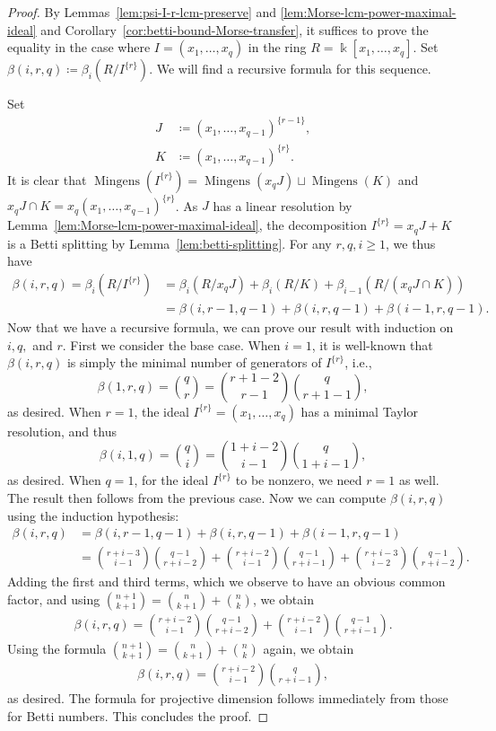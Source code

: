 \documentclass[reqno]{amsart}
\DeclareMathOperator{\mingens}{Mingens}
\theoremstyle{definition}
\theoremstyle{remark}
\numberwithin{equation}{section}
\begin{document}
\begin{proof}
    By Lemmas~\ref{lem:psi-I-r-lcm-preserve} and \ref{lem:Morse-lcm-power-maximal-ideal} and Corollary~\ref{cor:betti-bound-Morse-transfer}, it suffices to prove the equality in the case where $I=(x_1,\dots, x_q)$ in the ring $R=\Bbbk[x_1,\dots, x_q]$. Set $\beta(i,r,q)\coloneqq \beta_i(R/I^{\{r\}})$. We will find a recursive formula for this sequence.
    
    Set
    \begin{align*}
        J&\coloneqq (x_1,\dots, x_{q-1})^{\{r-1\}},\\
        K&\coloneqq (x_1,\dots, x_{q-1})^{\{r\}}.
    \end{align*}
    It is clear that $\mingens(I^{\{r\}})=\mingens(x_qJ)\sqcup \mingens(K)$ and $x_qJ\cap K= x_q (x_1,\dots, x_{q-1})^{\{r\}}$.   
    As $J$ has a linear resolution by Lemma~\ref{lem:Morse-lcm-power-maximal-ideal}, the decomposition $I^{\{r\}}=x_qJ+K$ is a Betti splitting by Lemma~\ref{lem:betti-splitting}. For any $r,q,i\geq 1$, we thus have
    \begin{align*}
        \beta(i,r,q) = \beta_i(R/I^{\{r\}}) &= \beta_i(R/x_qJ) + \beta_i(R/K) + \beta_{i-1}(R/(x_qJ\cap K))\\
        &=  \beta(i,r-1,q-1) + \beta(i,r,q-1)  + \beta(i-1,r,q-1).
    \end{align*}
    Now that we have a recursive formula, we can prove our result with induction on $i,q,$ and $r$. First we consider the base case. When $i=1$, it is well-known that $\beta(i,r,q)$ is simply the minimal number of generators of $I^{\{r\}}$, i.e.,
    \[
    \beta(1,r,q) = \binom{q}{r} = \binom{r+1-2}{r-1}\binom{q}{r+1-1},
    \]
    as desired. When $r=1$, the ideal $I^{\{r\}}=(x_1,\dots,x_q)$ has a minimal Taylor resolution, and thus
    \[
    \beta(i,1,q) = \binom{q}{i} = \binom{1+i-2}{i-1} \binom{q}{1+i-1},
    \]
    as desired. When $q=1$, for the ideal $I^{\{r\}}$ to be nonzero, we need $r=1$ as well. The result then follows from the previous case. Now we can compute $\beta(i,r,q)$ using the induction hypothesis:
    \begin{align*}
        \beta(i,r,q)&=\beta(i,r-1,q-1) + \beta(i,r,q-1)  + \beta(i-1,r,q-1) \\
        &=  \binom{r+i-3}{i-1}\binom{q-1}{r+i-2} + \binom{r+i-2}{i-1}\binom{q-1}{r+i-1} + \binom{r+i-3}{i-2}\binom{q-1}{r+i-2}.
    \end{align*}
    Adding the first and third terms, which we observe to have an obvious common factor, and using $\binom{n+1}{k+1}=\binom{n}{k+1}+\binom{n}{k}$, we obtain
    \begin{align*}
         \beta(i,r,q) =  \binom{r+i-2}{i-1}\binom{q-1}{r+i-2} + \binom{r+i-2}{i-1}\binom{q-1}{r+i-1}.
    \end{align*}
    Using the formula $\binom{n+1}{k+1}=\binom{n}{k+1}+\binom{n}{k}$ again, we obtain
    \begin{align*}
         \beta(i,r,q) =   \binom{r+i-2}{i-1}\binom{q}{r+i-1},
    \end{align*}
    as desired. The formula for projective dimension follows immediately from those for Betti numbers. This concludes the proof.
\end{proof}
\end{document}
